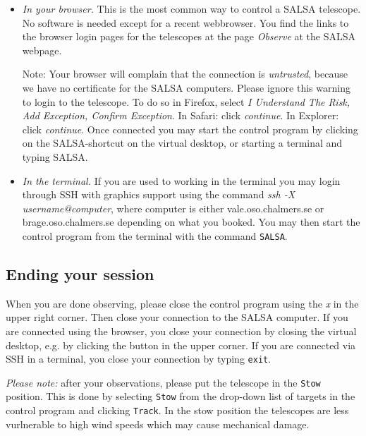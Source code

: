 \begin{itemize}
	\item{\emph{In your browser.} This is the most common way to control a
			SALSA telescope. No software is needed except for a recent 
			webbrowser. You find the links to the browser login pages for
			the telescopes at the page \emph{Observe} at the SALSA webpage.
			
		Note: Your browser will complain that the connection is \emph{untrusted},
			because we have no certificate for the SALSA computers. Please
			ignore this warning to login to the telescope. To do so in Firefox,
			select \emph{I Understand The Risk, Add Exception, Confirm
			Exception}. In Safari: click \emph{continue}. In Explorer: click
			\emph{continue}.  Once connected you may start the control program by
			clicking on the SALSA-shortcut on the virtual desktop, or starting
		a terminal and typing SALSA. }

\item{\emph{In the terminal.} If you are used to working in the terminal you
		may login through SSH with graphics support using the command \emph{ssh
		-X username@computer}, where computer is either vale.oso.chalmers.se or
		brage.oso.chalmers.se depending on what you booked.  You may then start
		the control program from the terminal with the command {\tt  SALSA}.}
\end{itemize}

\subsection{Ending your session}
When you are done observing, please close the control program using the
\emph{x} in the upper right corner. Then close your connection to the SALSA
computer. If you are connected using the browser, you close your connection by
closing the virtual desktop, e.g. by clicking the button in the upper corner. 
If you are connected via SSH in a terminal, you close your connection by 
typing {\tt exit}.

\emph{Please note:} after your observations, please put the telescope in the
\verb!Stow! position. This is done by selecting \verb!Stow! from the drop-down 
list of targets in the control program and clicking \verb!Track!. In the stow
position the telescopes are less vurlnerable to high wind speeds which may
cause mechanical damage.

